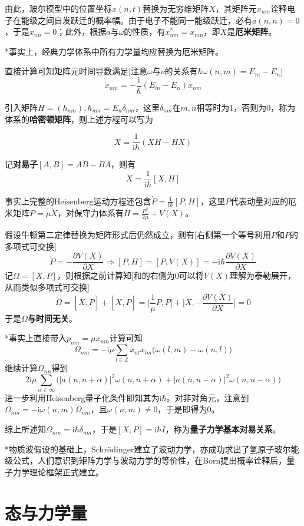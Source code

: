 \documentclass[a4paper,UTF8,fontset=windows]{ctexart}
\newcommand*{\ir}{\mathrm{i}}
\begin{document}
由此，玻尔模型中的位置坐标$x(n,t)$替换为无穷维矩阵$X$，其矩阵元$x_{nm}$诠释电子在能级之间自发跃迁的概率幅。由于电子不能同一能级跃迁，必有$a(n,n)=0$，于是$x_{nn}=0$；此外，根据$a$与$\omega$的性质，有$x_{nm}^*=x_{mn}$，即$X$是\textbf{厄米矩阵}。

*事实上，经典力学体系中所有力学量均应替换为厄米矩阵。

直接计算可知矩阵元时间导数满足[注意$\omega$与$\nu$的关系有$\hbar\omega(n,m)=E_m-E_n$]
$$\dot{x}_{nm}=-\frac{\ir}{\hbar}(E_m-E_n)x_{nm}$$

引入矩阵$H=(h_{nm}),h_{nm}=E_n\delta_{nm}$，这里$\delta_{nm}$在$m,n$相等时为1，否则为0，称为体系的\textbf{哈密顿矩阵}，则上述方程可以写为

$$\dot{X}=\frac{1}{\ir\hbar}(XH-HX)$$

记\textbf{对易子}$[A,B]=AB-BA$，则有
$$\dot{X}=\frac{1}{\ir\hbar}[X,H]$$

事实上完整的Heisenberg运动方程还包含$\dot{P}=\frac{1}{\ir\hbar}[P,H]$，这里$P$代表动量对应的厄米矩阵$P=\mu\dot{X}$，对保守力体系有$H=\frac{P^2}{2\mu}+V(X)$。

假设牛顿第二定律替换为矩阵形式后仍然成立，则有[右侧第一个等号利用$P$和$P$的多项式可交换]
$$\dot{P}=-\frac{\partial V(X)}{\partial X}\Longrightarrow [P,H]=[P,V(X)]=-\ir\hbar\frac{\partial V(X)}{\partial X}$$
记$\Omega=[X,P]$，则根据之前计算知[和的右侧为0可以将$V(X)$理解为泰勒展开，从而类似多项式可交换]
$$\dot{\Omega}=[\dot{X},P]+[X,\dot{P}]=\bigg[\frac{1}{\mu}P,P\bigg]+\bigg[X,-\frac{\partial V(X)}{\partial X}\bigg]=0$$
于是$\Omega$\textbf{与时间无关}。

*事实上直接带入$p_{nm}=\mu\dot{x}_{nm}$计算可知
$$\Omega_{nm}=-\ir\mu\sum_{l\in\mathbb{Z}}x_{nl}x_{lm}\big(\omega(l,m)-\omega(n,l)\big)$$
继续计算$\Omega_{nn}$得到
$$2\ir\mu\sum_{\alpha\in\infty}\bigg(|a(n,n+\alpha)|^2\omega(n,n+\alpha)+|a(n,n-\alpha)|^2\omega(n,n-\alpha)\bigg)$$
进一步利用Heisenberg量子化条件即知其为$\ir\hbar$。对非对角元，注意到$\dot{\Omega}_{nm}=-\ir\omega(n,m)\Omega_{nm}$，且$\omega(n,m)\ne0$，于是即得为0。

综上所述知$\Omega_{nm}=\ir\hbar\delta_{nm}$，于是$[X,P]=\ir\hbar I$，称为\textbf{量子力学基本对易关系}。

*物质波假设的基础上，Schr\"odinger建立了波动力学，亦成功求出了氢原子玻尔能级公式，人们意识到矩阵力学与波动力学的等价性，在Born提出概率诠释后，量子力学理论框架正式建立。

\section{态与力学量}
\end{document}
